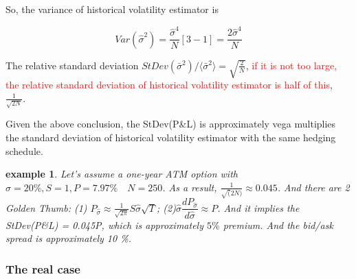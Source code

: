 \documentclass[a4]{article}
\newtheorem{example}{example}
\begin{document}
So, the variance of historical volatility estimator is\par 
$$
Var(\hat{\sigma}^{2})=\dfrac{\hat{\sigma}^{4}}{N}\left[3-1\right]=\dfrac{2\hat{\sigma}^{4}}{N}
$$\par 
\bigbreak 
\noindent The relative standard deviation $StDev(\bar{\sigma}^{2})/\langle\bar{\sigma}^{2}\rangle =\sqrt{\frac{2}{N}}$, \textcolor{red}{if it is not too large, the relative standard deviation of historical volatility estimator is half of this}, $\frac{1}{\sqrt{2N}}$.\par 
\bigbreak 
\noindent Given the above conclusion, the StDev(P\&L) is approximately vega multiplies the standard deviation of historical volatility estimator with the same hedging schedule.\par
\begin{example}
	Let's assume a one-year ATM option with $\hat{\sigma}=20\%, S=1, P = 7.97\%\quad N=250$. As a result, $\frac{1}{\sqrt(2N)}\approx0.045$. And there are 2 Golden Thumb: (1) $P_{\hat{\sigma}}\approx \frac{1}{\sqrt{2\pi}}S\hat{\sigma}\sqrt{T}$; (2)$\hat{\sigma}\dfrac{dP_{\hat{\sigma}}}{d\hat{\sigma}}\approx P$. And it implies the StDev(P\&L) = 0.045P, which is approximately $5\%$ premium. And the bid/ask spread is approximately 10 \%.
\end{example} 
\subsubsection{The real case}
\end{document}
